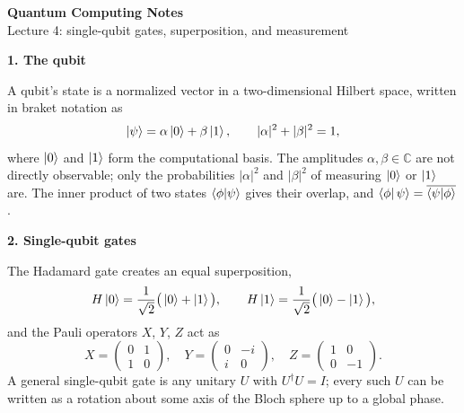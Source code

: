 \documentclass[10pt]{article}
\newcommand{\heading}[1]{{\bfseries\color{accent} #1}}
\begin{document}
{\LARGE\bfseries\color{accent} Quantum Computing Notes}\\[0.1em]
{\large Lecture 4: single-qubit gates, superposition, and measurement}

\vspace{0.7em}
\heading{1. The qubit}

A qubit's state is a normalized vector in a two-dimensional Hilbert space,
written in braket notation as
\[
  \ket{\psi} = \alpha \ket{0} + \beta \ket{1}, \qquad |\alpha|^2 + |\beta|^2 = 1,
\]
where $\ket{0}$ and $\ket{1}$ form the computational basis. The amplitudes
$\alpha,\beta \in \mathbb{C}$ are not directly observable; only the
probabilities $|\alpha|^2$ and $|\beta|^2$ of measuring $\ket{0}$ or $\ket{1}$
are. The inner product of two states $\braket{\phi}{\psi}$ gives their
overlap, and $\bra{\phi}\psi\rangle = \overline{\braket{\psi}{\phi}}$.

\heading{2. Single-qubit gates}

The Hadamard gate creates an equal superposition,
\[
  H\ket{0} = \frac{1}{\sqrt{2}}\big(\ket{0} + \ket{1}\big), \qquad
  H\ket{1} = \frac{1}{\sqrt{2}}\big(\ket{0} - \ket{1}\big),
\]
and the Pauli operators $X$, $Y$, $Z$ act as
\[
  X = \begin{pmatrix} 0 & 1 \\ 1 & 0 \end{pmatrix}, \quad
  Y = \begin{pmatrix} 0 & -i \\ i & 0 \end{pmatrix}, \quad
  Z = \begin{pmatrix} 1 & 0 \\ 0 & -1 \end{pmatrix}.
\]
A general single-qubit gate is any unitary $U$ with $U^\dagger U = I$; every
such $U$ can be written as a rotation about some axis of the Bloch sphere up
to a global phase.
\end{document}

